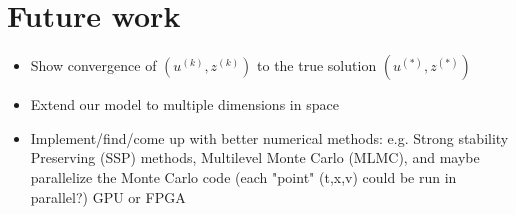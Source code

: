\section{Future work}
\begin{itemize}
    \item Show convergence of $(u^{(k)},z^{(k)})$ to the true solution $(u^{(*)},z^{(*)})$
    \item Extend our model to multiple dimensions in space 
    \item Implement/find/come up with better numerical methods: e.g. Strong stability Preserving (SSP) methods, Multilevel Monte Carlo (MLMC), and maybe parallelize the Monte Carlo code (each "point" (t,x,v) could be run in parallel?) GPU or FPGA
\end{itemize}